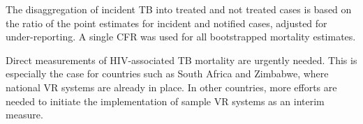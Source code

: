 The disaggregation of incident TB into treated and not treated cases is based on the ratio of the point estimates for incident and notified cases, adjusted for under-reporting. A single CFR was used for all bootstrapped mortality estimates.

Direct measurements of HIV-associated TB mortality are urgently needed. This is especially the case for countries such as South Africa and Zimbabwe, where national VR systems are already in place. In other countries, more efforts are needed to initiate the implementation of sample VR systems as an interim measure.


